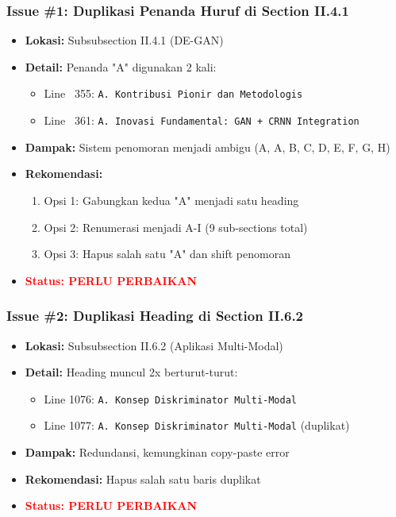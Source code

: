 \documentclass[11pt,a4paper]{article}
\begin{document}
\subsubsection*{Issue \#1: Duplikasi Penanda Huruf di Section II.4.1}
\begin{itemize}[leftmargin=*]
    \item \textbf{Lokasi:} Subsubsection II.4.1 (DE-GAN)
    \item \textbf{Detail:} Penanda "A" digunakan 2 kali:
    \begin{itemize}
        \item Line ~355: \texttt{A. Kontribusi Pionir dan Metodologis}
        \item Line ~361: \texttt{A. Inovasi Fundamental: GAN + CRNN Integration}
    \end{itemize}
    \item \textbf{Dampak:} Sistem penomoran menjadi ambigu (A, A, B, C, D, E, F, G, H)
    \item \textbf{Rekomendasi:} 
    \begin{enumerate}
        \item Opsi 1: Gabungkan kedua "A" menjadi satu heading
        \item Opsi 2: Renumerasi menjadi A-I (9 sub-sections total)
        \item Opsi 3: Hapus salah satu "A" dan shift penomoran
    \end{enumerate}
    \item \textcolor{red}{\textbf{Status: PERLU PERBAIKAN}}
\end{itemize}

\subsubsection*{Issue \#2: Duplikasi Heading di Section II.6.2}
\begin{itemize}[leftmargin=*]
    \item \textbf{Lokasi:} Subsubsection II.6.2 (Aplikasi Multi-Modal)
    \item \textbf{Detail:} Heading muncul 2x berturut-turut:
    \begin{itemize}
        \item Line 1076: \texttt{A. Konsep Diskriminator Multi-Modal}
        \item Line 1077: \texttt{A. Konsep Diskriminator Multi-Modal} (duplikat)
    \end{itemize}
    \item \textbf{Dampak:} Redundansi, kemungkinan copy-paste error
    \item \textbf{Rekomendasi:} Hapus salah satu baris duplikat
    \item \textcolor{red}{\textbf{Status: PERLU PERBAIKAN}}
\end{itemize}
\end{document}
